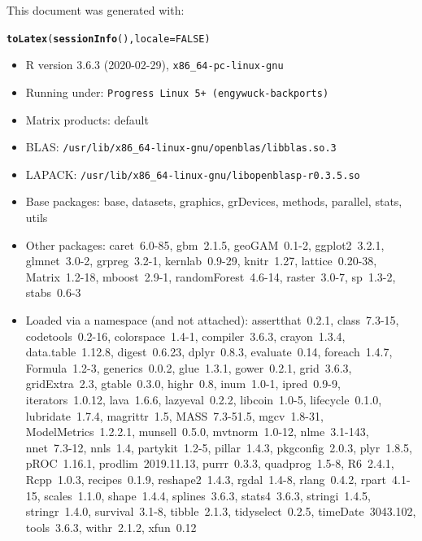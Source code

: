 \documentclass[11pt,a4paper,twoside]{article}\usepackage[]{graphicx}\usepackage[]{color}
\makeatletter
\newcommand{\hlnum}[1]{\textcolor[rgb]{0.686,0.059,0.569}{#1}}%
\newcommand{\hlstd}[1]{\textcolor[rgb]{0.345,0.345,0.345}{#1}}%
\newcommand{\hlkwc}[1]{\textcolor[rgb]{0.333,0.667,0.333}{#1}}%
\newcommand{\hlkwd}[1]{\textcolor[rgb]{0.737,0.353,0.396}{\textbf{#1}}}%
\newenvironment{kframe}{%
 \def\at@end@of@kframe{}%
 \ifinner\ifhmode%
  \def\at@end@of@kframe{\end{minipage}}%
  \begin{minipage}{\columnwidth}%
 \fi\fi%
 \def\FrameCommand##1{\hskip\@totalleftmargin \hskip-\fboxsep
 \colorbox{shadecolor}{##1}\hskip-\fboxsep
     \hskip-\linewidth \hskip-\@totalleftmargin \hskip\columnwidth}%
 \MakeFramed {\advance\hsize-\width
   \@totalleftmargin\z@ \linewidth\hsize
   \@setminipage}}%
 {\par\unskip\endMakeFramed%
 \at@end@of@kframe}
\makeatother
\begin{document}
\footnotesize
This document was generated with:
\begin{kframe}
\begin{alltt}
\hlkwd{toLatex}\hlstd{(}\hlkwd{sessionInfo}\hlstd{(),} \hlkwc{locale} \hlstd{=} \hlnum{FALSE}\hlstd{)}
\end{alltt}
\end{kframe}\begin{itemize}\raggedright
  \item R version 3.6.3 (2020-02-29), \verb|x86_64-pc-linux-gnu|
  \item Running under: \verb|Progress Linux 5+ (engywuck-backports)|
  \item Matrix products: default
  \item BLAS:   \verb|/usr/lib/x86_64-linux-gnu/openblas/libblas.so.3|
  \item LAPACK: \verb|/usr/lib/x86_64-linux-gnu/libopenblasp-r0.3.5.so|
  \item Base packages: base, datasets, graphics, grDevices, methods,
    parallel, stats, utils
  \item Other packages: caret~6.0-85, gbm~2.1.5, geoGAM~0.1-2,
    ggplot2~3.2.1, glmnet~3.0-2, grpreg~3.2-1, kernlab~0.9-29,
    knitr~1.27, lattice~0.20-38, Matrix~1.2-18, mboost~2.9-1,
    randomForest~4.6-14, raster~3.0-7, sp~1.3-2, stabs~0.6-3
  \item Loaded via a namespace (and not attached): assertthat~0.2.1,
    class~7.3-15, codetools~0.2-16, colorspace~1.4-1, compiler~3.6.3,
    crayon~1.3.4, data.table~1.12.8, digest~0.6.23, dplyr~0.8.3,
    evaluate~0.14, foreach~1.4.7, Formula~1.2-3, generics~0.0.2,
    glue~1.3.1, gower~0.2.1, grid~3.6.3, gridExtra~2.3, gtable~0.3.0,
    highr~0.8, inum~1.0-1, ipred~0.9-9, iterators~1.0.12, lava~1.6.6,
    lazyeval~0.2.2, libcoin~1.0-5, lifecycle~0.1.0, lubridate~1.7.4,
    magrittr~1.5, MASS~7.3-51.5, mgcv~1.8-31, ModelMetrics~1.2.2.1,
    munsell~0.5.0, mvtnorm~1.0-12, nlme~3.1-143, nnet~7.3-12, nnls~1.4,
    partykit~1.2-5, pillar~1.4.3, pkgconfig~2.0.3, plyr~1.8.5,
    pROC~1.16.1, prodlim~2019.11.13, purrr~0.3.3, quadprog~1.5-8,
    R6~2.4.1, Rcpp~1.0.3, recipes~0.1.9, reshape2~1.4.3, rgdal~1.4-8,
    rlang~0.4.2, rpart~4.1-15, scales~1.1.0, shape~1.4.4,
    splines~3.6.3, stats4~3.6.3, stringi~1.4.5, stringr~1.4.0,
    survival~3.1-8, tibble~2.1.3, tidyselect~0.2.5, timeDate~3043.102,
    tools~3.6.3, withr~2.1.2, xfun~0.12
\end{itemize}

\normalsize
\end{document}
